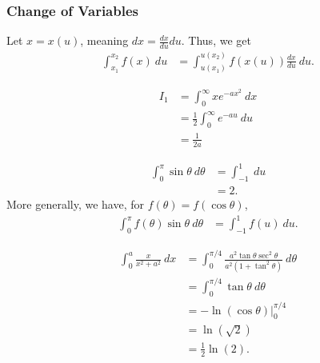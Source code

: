 \documentclass[10pt]{mypackage}
\begin{document}
\subsubsection{Change of Variables}%
\begin{definition}[$u$-Substitution]
  Let $x = x(u)$, meaning $dx = \frac{dx}{du}du$. Thus, we get
  \begin{align*}
    \int_{x_1}^{x_2} f(x)\:du &= \int_{u(x_1)}^{u(x_2)} f\left(x(u)\right)\frac{dx}{du}\:du.
  \end{align*}
\end{definition}
\begin{example}
  \begin{align*}
    I_1 &= \int_{0}^{\infty} xe^{-ax^2}\:dx\\
        &= \frac{1}{2}\int_{0}^{\infty} e^{-au}\:du\tag*{$u = x^2$}\\
        &= \frac{1}{2a}
  \end{align*}
\end{example}
\begin{example}
  \begin{align*}
    \int_{0}^{\pi} \sin\theta\:d\theta &= \int_{-1}^{1} \:du\tag*{$u = \cos\theta$}\\
                                       &= 2.
  \end{align*}
  More generally, we have, for $f(\theta) = f(\cos\theta)$,
  \begin{align*}
    \int_{0}^{\pi} f(\theta)\sin\theta\:d\theta &= \int_{-1}^{1} f(u)\:du.
  \end{align*}
\end{example}
\begin{example}
  \begin{align*}
  \int_{0}^{a} \frac{x}{x^2 + a^2}\:dx &= \int_{0}^{\pi/4} \frac{a^2\tan\theta\sec^2\theta}{a^2\left(1 + \tan^2\theta\right)}\:d\theta\tag*{$x = a\tan\theta$}\\
                                       &= \int_{0}^{\pi/4} \tan\theta\:d\theta\\
                                       &= -\ln\left(\cos\theta\right)\bigr\vert_{0}^{\pi/4}\\
                                       &= \ln\left(\sqrt{2}\right)\\
                                       &= \frac{1}{2}\ln(2).
  \end{align*}
\end{example}
\end{document}
